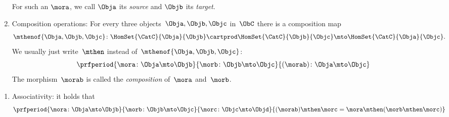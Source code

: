 \begin{ctdefinition}[Semicategory]
\begin{body}
\begin{enumerate}
                  For such an $\mora$, we call $\Obja$ its \emph{source} and $\Objb$ its \emph{target}.
            \item Composition operations: For every three objects~$\Obja,\Objb,\Objc$ in~$\ObC$ there is a composition map
                  \begin{equation}
                      \mthenof{\Obja,\Objb,\Objc}\colon \HomSet{\CatC}{\Obja}{\Objb} \cartprod \HomSet{\CatC}{\Objb}{\Objc}\mto \HomSet{\CatC}{\Obja}{\Objc}.
                  \end{equation}
                  We usually just write~$\mthen$ instead of~$\mthenof{\Obja,\Objb,\Objc}$:
                  \begin{equation}
                      \prfperiod{
                          \mora \colon \Obja \mto \Objb
                      }{
                          \morb\colon \Objb \mto \Objc
                      }{
                          (\morab )\colon \Obja \mto \Objc
                      }
                  \end{equation}
                  The morphism~$\morab$ is called the \emph{composition} of~$\mora$ and~$\morb$.
        \end{enumerate}
        \condit
        \begin{enumerate}
            \item Associativity: it holds that
                  \begin{equation}
                      \prfperiod{
                          \mora\colon \Obja \mto \Objb
                      }{
                          \morb\colon \Objb \mto \Objc
                      }{
                          \morc\colon \Objc \mto \Objd
                      }{
                          (\morab)
                          \mthen \morc= \mora \mthen (\morb \mthen \morc)
                      }
                  \end{equation}
        \end{enumerate}
    \end{body}
\end{ctdefinition}

